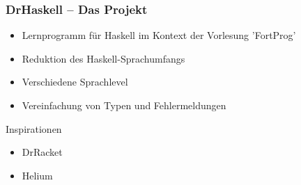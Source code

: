 \begin{frame}
	\frametitle{DrHaskell -- Das Projekt}
	\begin{itemize}
		\item Lernprogramm für Haskell im Kontext der Vorlesung 'FortProg' \pause
		\item Reduktion des Haskell-Sprachumfangs
		\item Verschiedene Sprachlevel
		\item Vereinfachung von Typen und Fehlermeldungen
	\end{itemize}
	Inspirationen \pause
	\begin{itemize}
		\item DrRacket
		\item Helium
	\end{itemize}
\end{frame}